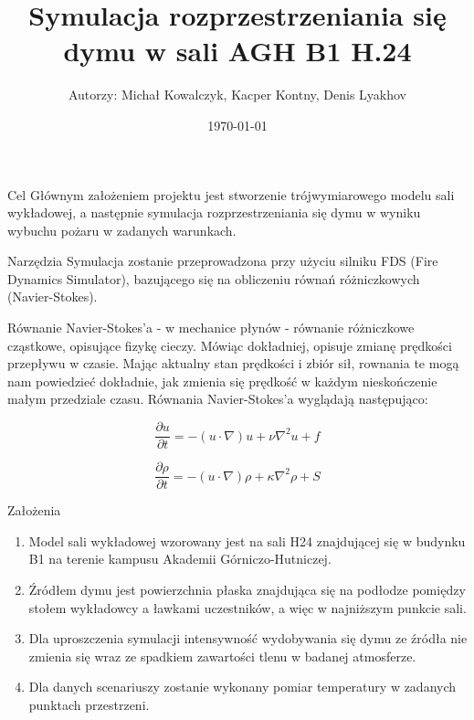 \documentclass[a4paper, 12pt]{scrartcl}
\title{Symulacja rozprzestrzeniania się dymu w sali AGH B1 H.24}
\author{Autorzy: Michał Kowalczyk, Kacper Kontny, Denis Lyakhov}
\date{\today}
\begin{document}
	\maketitle
	
	\begin{section}{Cel}
		Głównym założeniem projektu jest stworzenie trójwymiarowego modelu sali wykładowej, a następnie symulacja rozprzestrzeniania się dymu w wyniku wybuchu pożaru w zadanych warunkach. 
	\end{section}
	
	\begin{section}{Narzędzia}
	Symulacja zostanie przeprowadzona przy użyciu silniku FDS (Fire Dynamics Simulator),
    bazującego się na obliczeniu równań różniczkowych (Navier-Stokes).
    
    \vspace{5mm}
    
    Równanie Navier-Stokes’a - w mechanice płynów - równanie różniczkowe cząstkowe,
    opisujące fizykę cieczy. Mówiąc dokładniej, opisuje zmianę prędkości przepływu w czasie.
    Mając aktualny stan prędkości i zbiór sił, rownania te mogą nam powiedzieć dokładnie,
    jak zmienia się prędkość w każdym nieskończenie małym przedziale czasu.
    Równania Navier-Stokes’a wyglądają następująco:
    
    \begin{equation}
	    \frac{\partial u}{\partial t} = -(u \cdot \nabla)u+\nu\nabla^{2}u+f
	\end{equation}
	
	\begin{equation}
	    \frac{\partial \rho}{\partial t}=-(u\cdot\nabla)\rho+\kappa\nabla^{2}\rho + S
	\end{equation}

	\end{section}

	\begin{section}{Założenia}
		\begin{enumerate}
			\item Model sali wykładowej wzorowany jest na sali H24 znajdującej się w budynku B1 na terenie kampusu Akademii Górniczo-Hutniczej.
			\item Źródłem dymu jest powierzchnia płaska znajdująca się na podłodze pomiędzy stołem wykładowcy a ławkami uczestników, a więc w najniższym punkcie sali.
			\item Dla uproszczenia symulacji intensywność wydobywania się dymu ze źródła nie zmienia się wraz ze spadkiem zawartości tlenu w badanej atmosferze.
			\item Dla danych scenariuszy zostanie wykonany pomiar temperatury w zadanych punktach przestrzeni.
		\end{enumerate}
	\end{section}
\end{document}
